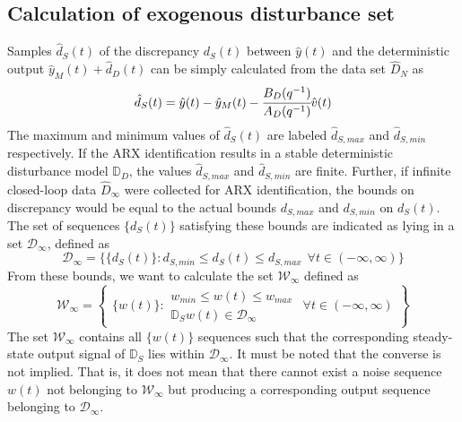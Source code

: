 \documentclass[letterpaper, 10 pt, conference]{ieeeconf}  %
\begin{document}
	\subsection{Calculation of exogenous disturbance set}
	\label{Noise}
	Samples $\hat{d}_S(t)$ of the discrepancy $d_S(t)$ between $\hat{y}(t)$ and the deterministic output $\hat{y}_M(t)+\hat{d}_D(t)$ can be simply calculated from the data set $\hat{D}_{N}$ as 
	\begin{equation*}
	\hat{d}_S(t) = \hat{y}(t)-\hat{y}_M(t)-\cfrac{B_D(q^{-1})}{A_D(q^{-1})} \hat{v}(t) 
	\end{equation*}
	The maximum and minimum values of $\hat{d}_S(t)$ are labeled $\hat{d}_{S,max}$ and $\hat{d}_{S,min}$ respectively. If the ARX identification results in a stable deterministic disturbance model $\mathbb{D}_D$, the values $\hat{d}_{S,max}$ and $\hat{d}_{S,min}$ are finite. Further, if infinite closed-loop data $\hat{D}_{\infty}$ were collected for ARX identification, the bounds on discrepancy would be equal to the actual bounds $d_{S,max}$ and $d_{S,min}$ on $d_S(t)$. The set of sequences $\{d_S(t)\}$ satisfying these bounds are indicated as lying in a set $\mathcal{D}_{\infty}$, defined as 
	\begin{equation*}
	\mathcal{D}_{\infty} = \{\{d_S(t)\}: d_{S,min} \leq d_S(t) \leq d_{S,max} \hspace{5pt} \forall t \in (-\infty,\infty) \}
	\end{equation*}
	 From these bounds, we want to calculate the set $\mathcal{W}_{\infty}$ defined as
	\begin{equation*}
	\hspace{0pt}
	\mathcal{W}_{\infty} = \begin{Bmatrix} \{w(t)\}: 
	\begin{matrix}
	w_{min}\leq w(t)\leq w_{max} \\ 
	\mathbb{D}_S w(t) \in \mathcal{D}_{\infty}
	\end{matrix} \hspace{5pt}
	\forall t \in (-\infty,\infty) 
	\end{Bmatrix}
	\end{equation*}  
	The set $\mathcal{W}_{\infty}$ contains all $\{w(t)\}$ sequences such that the corresponding steady-state output signal of $\mathbb{D}_S$ lies within $\mathcal{D}_{\infty}$. It must be noted that the converse is not implied. That is, it does not mean that there cannot exist a noise sequence $w(t)$ not belonging to $\mathcal{W}_{\infty}$ but producing a corresponding output sequence belonging to $\mathcal{D}_{\infty}$.
\end{document}
